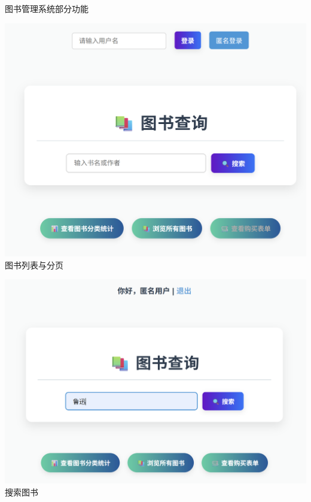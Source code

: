 \documentclass{ctexbeamer}
\begin{document}
\begin{frame}{图书管理系统部分功能}
  \centering
  \begin{minipage}{0.45\textwidth}
    \includegraphics[width=\textwidth]{fig/book1.png}\\ 图书列表与分页
  \end{minipage}
  \begin{minipage}{0.45\textwidth}
    \includegraphics[width=\textwidth]{fig/book2.png}\\ 搜索图书
  \end{minipage}
  \vspace{0.3cm}
  \begin{minipage}{0.45\textwidth}

\end{minipage}
\end{frame}
\end{document}
